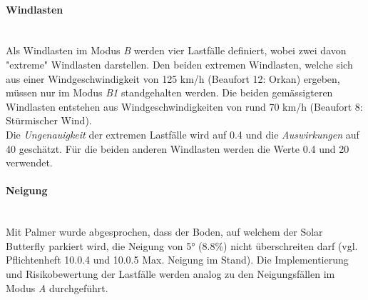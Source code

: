 \paragraph{Windlasten}\mbox{}\\
Als Windlasten im Modus \emph{B} werden vier Lastfälle definiert, wobei zwei davon "extreme" Windlasten darstellen. Den beiden extremen Windlasten, welche sich aus einer Windgeschwindigkeit von 125 km/h (Beaufort 12: Orkan) ergeben, müssen nur im Modus \emph{B1} standgehalten werden. Die beiden gemässigteren Windlasten entstehen aus Windgeschwindigkeiten von rund 70 km/h (Beaufort 8: Stürmischer Wind).\\
Die \emph{Ungenauigkeit} der extremen Lastfälle wird auf 0.4 und die \emph{Auswirkungen} auf 40 geschätzt. Für die beiden anderen Windlasten werden die Werte 0.4 und 20 verwendet.
%

\paragraph{Neigung}\mbox{}\\
Mit Palmer wurde abgesprochen, dass der Boden, auf welchem der Solar Butterfly parkiert wird, die Neigung von 5° (8.8\%) nicht überschreiten darf (vgl. Pflichtenheft 10.0.4 und 10.0.5 Max. Neigung im Stand). Die Implementierung und Risikobewertung der Lastfälle werden analog zu den Neigungsfällen im Modus \emph{A} durchgeführt.

